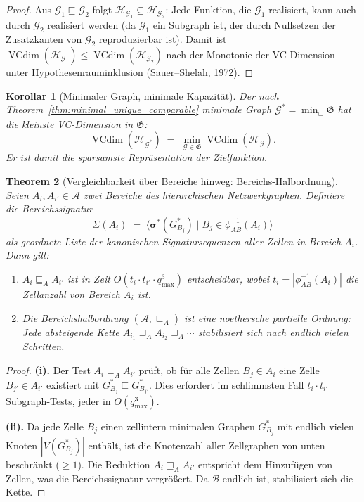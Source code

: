 \documentclass[12pt, a4paper, openany]{report}
\newtheorem{theorem}{Theorem}[chapter]
\newtheorem{corollary}[theorem]{Korollar}
\newcommand{\calG}{\mathcal{G}}
\newcommand{\calH}{\mathcal{H}}
\newcommand{\calA}{\mathcal{A}}
\newcommand{\calB}{\mathcal{B}}
\DeclareMathOperator{\VC}{VCdim}
\begin{document}
\begin{proof}
Aus $\calG_1 \sqsubseteq \calG_2$ folgt $\calH_{\calG_1} \subseteq \calH_{\calG_2}$:
Jede Funktion, die $\calG_1$ realisiert, kann auch durch $\calG_2$ realisiert
werden (da $\calG_1$ ein Subgraph ist, der durch Nullsetzen der Zusatzkanten
von $\calG_2$ reproduzierbar ist).  Damit ist
$\VC(\calH_{\calG_1}) \leq \VC(\calH_{\calG_2})$ nach der Monotonie der
VC-Dimension unter Hypothesenrauminklusion (Sauer--Shelah, 1972).
\end{proof}

\begin{corollary}[Minimaler Graph, minimale Kapazität]
\label{cor:minimal_cap}
Der nach Theorem~\ref{thm:minimal_unique_comparable} minimale Graph
$\calG^* = \min_{\sqsubseteq} \mathfrak{G}$ hat die kleinste
VC-Dimension in $\mathfrak{G}$:
\[
  \VC(\calH_{\calG^*}) \;=\; \min_{\calG \in \mathfrak{G}} \VC(\calH_{\calG}).
\]
Er ist damit die \emph{sparsamste} Repräsentation der Zielfunktion.
\end{corollary}

\begin{theorem}[Vergleichbarkeit über Bereiche hinweg: Bereichs-Halbordnung]
\label{thm:region_partial_order}
Seien $A_i, A_{i'} \in \calA$ zwei Bereiche des hierarchischen
Netzwerkgraphen.  Definiere die \emph{Bereichssignatur}
\[
  \Sigma(A_i) \;=\; \bigl\langle \bm{\sigma}^*(G^*_{B_j}) \;\big|\; B_j \in \phi_{AB}^{-1}(A_i) \bigr\rangle
\]
als geordnete Liste der kanonischen Signatursequenzen aller Zellen in
Bereich $A_i$.  Dann gilt:
\begin{enumerate}[label=(\roman*)]
  \item $A_i \sqsubseteq_A A_{i'}$ ist in Zeit
    $O(t_i \cdot t_{i'} \cdot q_{\max}^3)$ entscheidbar, wobei
    $t_i = |\phi_{AB}^{-1}(A_i)|$ die Zellanzahl von Bereich $A_i$ ist.
  \item Die Bereichshalbordnung $(\calA, \sqsubseteq_A)$ ist eine noethersche
    partielle Ordnung: Jede absteigende Kette $A_{i_1} \sqsupseteq_A A_{i_2} \sqsupseteq_A \cdots$
    stabilisiert sich nach endlich vielen Schritten.
\end{enumerate}
\end{theorem}

\begin{proof}
\textbf{(i).}
Der Test $A_i \sqsubseteq_A A_{i'}$ prüft, ob für alle Zellen $B_j \in A_i$
eine Zelle $B_{j'} \in A_{i'}$ existiert mit $G^*_{B_j} \sqsubseteq G^*_{B_{j'}}$.
Dies erfordert im schlimmsten Fall $t_i \cdot t_{i'}$ Subgraph-Tests, jeder
in $O(q_{\max}^3)$.

\textbf{(ii).}
Da jede Zelle $B_j$ einen zellintern minimalen Graphen $G^*_{B_j}$ mit
endlich vielen Knoten $|V(G^*_{B_j})|$ enthält, ist die Knotenzahl aller
Zellgraphen von unten beschränkt ($\geq 1$).  Die Reduktion
$A_i \sqsupseteq_A A_{i'}$ entspricht dem Hinzufügen von Zellen, was die
Bereichssignatur vergrößert.  Da $\calB$ endlich ist, stabilisiert sich
die Kette.
\end{proof}
\end{document}
